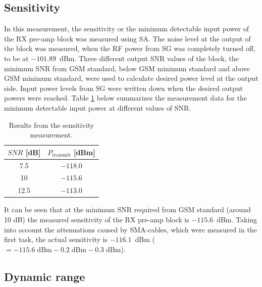 \documentclass[a4paper, 12pt]{article}
\begin{document}
\subsection{Sensitivity}

In this measurement, the sensitivity or the minimum detectable input power of the RX pre-amp block 
was measured using SA. The noise level at the output of the block was measured, when the RF power from 
SG was completely turned off, to be at $-101.89$~dBm. Three different output SNR values of the block, 
the minimum SNR from GSM standard, below GSM minimum standard and above GSM minimum standard, were 
used to calculate desired power level at the output side. Input power levels from SG were written 
down when the desired output powers were reached. Table \ref{t:sens} below summarizes the 
measurement data for the minimum detectable input power at different values of SNR.

\begin{table}[!h]
	\begin{center}
	\caption{Results from the sensitivity measurement.}
	\label{t:sens}
	\renewcommand*{\arraystretch}{1.2}
	\begin{tabular}{cc}
	$\mathit{SNR}$ [dB] 			& $P_\mathrm{transmit}$ [dBm]  \\
	\hline
	7.5								& $-118.0$ 	\\
	10								& $-115.6$ 	\\
	12.5							& $-113.0$ 	
	\end{tabular}
	\end{center}
	\vspace*{-12pt}
\end{table}

It can be seen that at the minimum SNR required from GSM standard (around 10 dB) the measured 
sensitivity of the RX pre-amp block is $-115.6$~dBm. Taking into account the attenuations caused 
by SMA-cables, which were measured in the first task, the actual sensitivity is $-116.1$~dBm 
(${\!\!}=-115.6\mathrm{\;dBm} - 0.2\mathrm{\;dBm} - 0.3\mathrm{\;dBm}$).

\subsection{Dynamic range}
\end{document}
